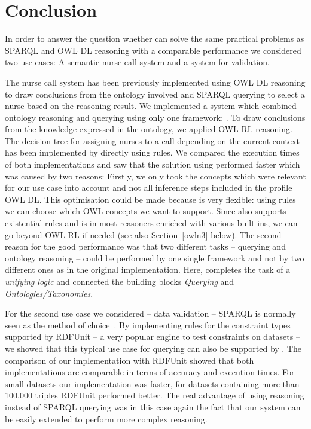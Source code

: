 \section{Conclusion}
In order to answer the question whether \nthreelogic can solve the same practical problems as SPARQL and OWL DL reasoning with a comparable performance we considered two use cases:
A semantic nurse call system and a system for \rdf validation.  

The nurse call system has been previously implemented using OWL DL reasoning to draw conclusions from the ontology involved
and SPARQL querying to select a nurse based on the reasoning 
result. 
We implemented a system which combined ontology reasoning and querying using only one framework: \nthreelogic. To draw conclusions from 
the knowledge expressed in the ontology, we applied OWL RL reasoning. 
The decision tree
for assigning nurses to a call depending on the current context has been implemented by directly using \nthree rules. 
We compared the execution times of both implementations and saw that the solution using \nthree performed faster which was caused by two reasons:
Firstly, we only took the \owl concepts which were relevant for our use case into account and not all inference steps included in the profile OWL DL. 
This optimisation could be made because \nthreelogic is very flexible: using rules we can choose which OWL concepts we want to support. 
Since \nthree also supports existential rules and is in most reasoners enriched with various built-ins, we can go beyond OWL RL if needed 
(see also Section~\ref{owln3} below).
The second reason for the good performance was that two different tasks -- querying and ontology reasoning -- could be performed by one single framework and
not by two 
different ones as in the original implementation. Here, \nthree completes the task of a \emph{unifying logic} and connected the building blocks \emph{Querying} and 
\emph{Ontologies/Taxonomies}.

For the second use case  we considered -- \rdf data validation -- SPARQL is normally seen as the method of choice~\cite[p. 143]{hartmann2016}. By implementing 
rules for the constraint types supported by RDFUnit -- a very popular engine to test constraints on \rdf datasets -- 
we showed that this typical use case for querying 
can also be supported by \nthreelogic. The comparison of our implementation with RDFUnit showed that both implementations are comparable in terms of accuracy and 
execution times. For small datasets our implementation was faster, for datasets containing more than 100,000 triples RDFUnit performed better.
The real advantage of using \nthree reasoning instead of SPARQL querying was in this case again the fact that our system can be easily extended to perform more complex 
reasoning.

